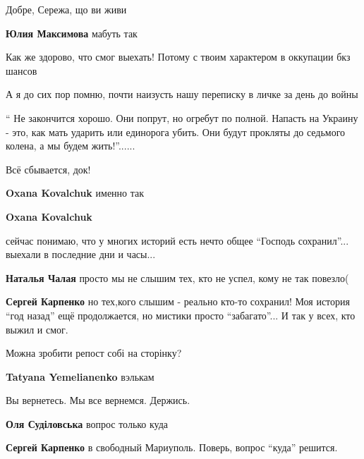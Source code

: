 
Добре, Сережа, що ви живи

\begin{itemize} %
\textbf{Юлия Максимова} мабуть так
\end{itemize} %


Как же здорово, что смог выехать! Потому с твоим характером в оккупации бкз шансов


А я до сих пор помню, почти наизусть нашу переписку в личке за день до войны

\enquote{ Не закончится хорошо. Они попрут, но огребут по полной. Напасть на Украину -
это, как мать ударить или единорога убить. Они будут прокляты до седьмого
колена, а мы будем жить!}......

Всё сбывается, док!

\begin{itemize} %
\textbf{Oxana Kovalchuk} именно так

\textbf{Oxana Kovalchuk} 

сейчас понимаю, что у многих историй есть нечто общее \enquote{Господь сохранил}... выехали в последние дни и часы...

\textbf{Наталья Чалая} просто мы не слышим тех, кто не успел, кому не так повезло(

\textbf{Сергей Карпенко} но тех,кого слышим - реально кто-то сохранил!
Моя история \enquote{год назад} ещё продолжается, но мистики просто \enquote{забагато}... И так у всех, кто выжил и смог.
\end{itemize} %


Можна зробити репост собі на сторінку?

\begin{itemize} %
\textbf{Tatyana Yemelianenko} вэлькам
\end{itemize} %


Вы вернетесь. Мы все вернемся. Держись.

\begin{itemize} %
\textbf{Оля Суділовська} вопрос только куда

\textbf{Сергей Карпенко} в свободный Мариуполь. Поверь, вопрос \enquote{куда} решится.
\end{itemize} %

